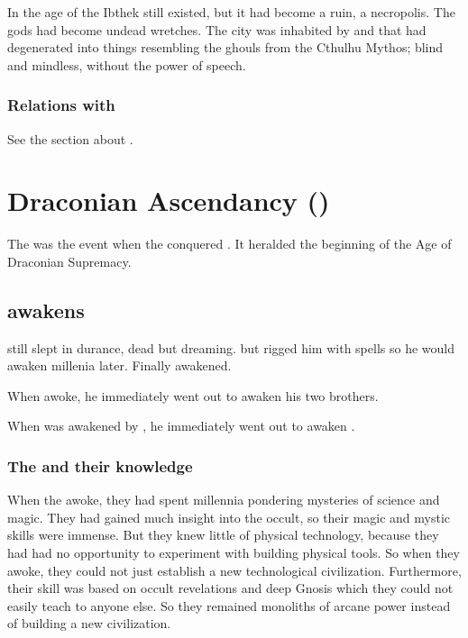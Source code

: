 In the age of the \VaimonCaliphate Ibthek still existed, but it had become a ruin, a necropolis. 
The gods had become undead wretches.
The city was inhabited by \humans and \nephilim that had degenerated into things resembling the ghouls from the Cthulhu Mythos; blind and mindless, without the power of speech.





\subsubsection{Relations with \nephilim}
See the section about . 












\section{Draconian Ascendancy ()}
The  was the event when the \dragons conquered \Miith. 
It heralded the beginning of the Age of Draconian Supremacy. 









\subsection{\Nexagglachel awakens}
\Nexagglachel still slept in durance, dead but dreaming.
\Sethicus {} but rigged him with spells so he would awaken millenia later. 
Finally \Nexagglachel awakened. 

When \Nexagglachel awoke, he immediately went out to awaken his two brothers.

When \Ishnaruchaefir was awakened by \Nexagglachel, he immediately went out to awaken \Rystessakhin. 





\subsubsection{The \dragons and their knowledge}
When the \dragons awoke, they had spent millennia pondering mysteries of science and magic. 
They had gained much insight into the occult, so their magic and mystic skills were immense. 
But they knew little of physical technology, because they had had no opportunity to experiment with building physical tools. 
So when they awoke, they could not just establish a new technological civilization. 
Furthermore, their skill was based on occult revelations and deep Gnosis which they could not easily teach to anyone else. 
So they remained monoliths of arcane power instead of building a new civilization. 

